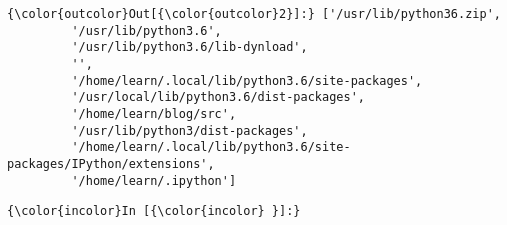 \documentclass[11pt]{article}
\begin{document}
\begin{Verbatim}[commandchars=\\\{\}]
{\color{outcolor}Out[{\color{outcolor}2}]:} ['/usr/lib/python36.zip',
         '/usr/lib/python3.6',
         '/usr/lib/python3.6/lib-dynload',
         '',
         '/home/learn/.local/lib/python3.6/site-packages',
         '/usr/local/lib/python3.6/dist-packages',
         '/home/learn/blog/src',
         '/usr/lib/python3/dist-packages',
         '/home/learn/.local/lib/python3.6/site-packages/IPython/extensions',
         '/home/learn/.ipython']
\end{Verbatim}
            
    \begin{Verbatim}[commandchars=\\\{\}]
{\color{incolor}In [{\color{incolor} }]:} 
\end{Verbatim}


    
    
    
    
\end{document}
